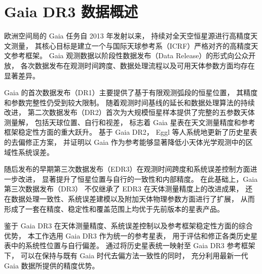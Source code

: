 \section{Gaia DR3 数据概述}

欧洲空间局的 Gaia 任务自 2013 年发射以来，
持续对全天空恒星源进行高精度天文测量，
其核心目标是建立一个与国际天球参考系（ICRF）严格对齐的高精度天文参考框架。
Gaia 观测数据以阶段性数据发布（Data Release）的形式向公众开放，
各次数据发布在观测时间跨度、数据处理流程以及可用天体参数方面均存在显著差异。

Gaia 的首次数据发布（DR1）主要提供了基于有限观测弧段的恒星位置，
其精度和参数完整性仍受到较大限制。
随着观测时间基线的延长和数据处理算法的持续改进，
第二次数据发布（DR2）首次为大规模恒星样本提供了完整的五参数天体测量解，
包括天球位置、自行和视差，
标志着 Gaia 星表在天文测量精度和参考框架稳定性方面的重大跃升。
基于 Gaia DR2，
Eggl 等人系统地更新了历史星表的去偏修正方案，
并证明以 Gaia 作为参考能够显著降低小天体光学观测中的区域性系统误差。

随后发布的早期第三次数据发布（EDR3）在观测时间跨度和系统误差控制方面进一步改进，
显著提升了恒星位置与自行的一致性和内部精度。
在此基础上，Gaia 第三次数据发布（DR3）
不仅继承了 EDR3 在天体测量精度上的改进成果，
还在数据处理一致性、系统误差建模以及附加天体物理参数方面进行了扩展，
从而形成了一套在精度、稳定性和覆盖范围上均优于先前版本的星表产品。

鉴于 Gaia DR3 在天体测量精度、系统误差控制以及参考框架稳定性方面的综合优势，
本工作选用 Gaia DR3 作为统一的参考星表，
用于评估和修正各类历史星表中的系统性位置与自行偏差。
通过将历史星表统一映射至 Gaia DR3 参考框架下，
可以在保持与既有 Gaia 时代去偏方法一致性的同时，
充分利用最新一代 Gaia 数据所提供的精度优势。

\newpage